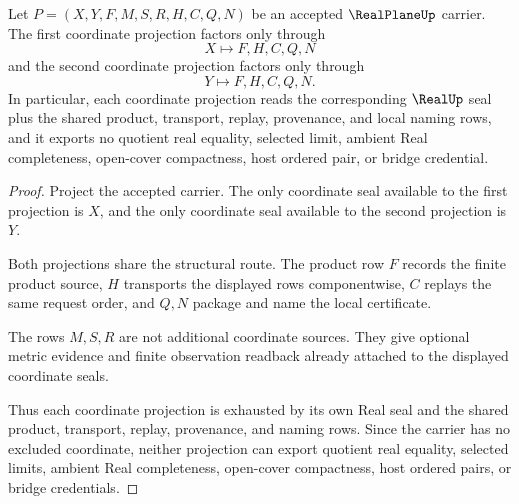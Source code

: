 \begin{theorem}
\label{thm:real-plane-coordinate-projection-stability}
Let $P=(X,Y,F,M,S,R,H,C,Q,N)$ be an accepted $\RealPlaneUp$ carrier. The first coordinate projection factors only through
$$
X\longmapsto F,H,C,Q,N
$$
and the second coordinate projection factors only through
$$
Y\longmapsto F,H,C,Q,N .
$$
In particular, each coordinate projection reads the corresponding $\RealUp$ seal plus the shared product, transport, replay, provenance, and local naming rows, and it exports no quotient real equality, selected limit, ambient Real completeness, open-cover compactness, host ordered pair, or bridge credential.
\end{theorem}
\begin{proof}
Project the accepted carrier. The only coordinate seal available to the first projection is $X$, and the only coordinate seal available to the second projection is $Y$.

Both projections share the structural route. The product row $F$ records the finite product source, $H$ transports the displayed rows componentwise, $C$ replays the same request order, and $Q,N$ package and name the local certificate.

The rows $M,S,R$ are not additional coordinate sources. They give optional metric evidence and finite observation readback already attached to the displayed coordinate seals.

Thus each coordinate projection is exhausted by its own Real seal and the shared product, transport, replay, provenance, and naming rows. Since the carrier has no excluded coordinate, neither projection can export quotient real equality, selected limits, ambient Real completeness, open-cover compactness, host ordered pairs, or bridge credentials.
\end{proof}

\begin{closurestatus}{\RealPlaneUp}
  \theoryclosure{\seedClosure}
  \formalstatus{\unformalizedV}
\end{closurestatus}
